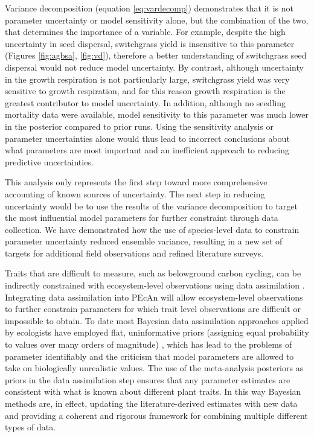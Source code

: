 \documentclass[12pt]{article}
\begin{document}
\begin{flushleft}
\begin{spacing}{1.9}
 Variance decomposition (equation \ref{eq:vardecomp}) demonstrates that it is not parameter uncertainty or model sensitivity alone, but the combination of the two, that determines the importance of a variable.
 For example, despite the high uncertainty in seed dispersal, switchgrass yield is insensitive to this parameter  (Figures \ref{fig:agbsa}, \ref{fig:vd}), therefore a better understanding of switchgrass seed dispersal would not reduce model uncertainty.
 By contrast, although uncertainty in the growth respiration is not particularly large, switchgrass yield was very sensitive to growth respiration, and for this reason growth respiration is the greatest contributor to model uncertainty.
 In addition, although no seedling mortality data were available, model sensitivity to this parameter was much lower in the posterior compared to prior runs.
 Using the sensitivity analysis or parameter uncertainties alone would thus lead to incorrect conclusions about what parameters are most important and an inefficient approach to reducing predictive uncertainties.

 This analysis only represents the first step toward more comprehensive accounting of known sources of uncertainty.
 The next step in reducing uncertainty would be to use the results of the variance decomposition to target the most influential model parameters for further constraint through data collection.
 We have demonstrated how the use of species-level data to constrain parameter uncertainty reduced ensemble variance, resulting in a new set of targets for additional field observations and refined literature surveys. 

 Traits that are difficult to measure, such as belowground carbon cycling, can be indirectly constrained with ecosystem-level observations using data assimilation \citep{luo2009pic,luo2011efd}.
 Integrating data assimilation into PEcAn will allow ecosystem-level observations to further constrain parameters for which trait level observations are difficult or impossible to obtain.
 To date most Bayesian data assimilation approaches applied by ecologists have employed flat, uninformative priors (assigning equal probability to values over many orders of magnitude) , which has lead to the problems of parameter identifiably and the criticism that model parameters are allowed to take on biologically unrealistic values.
 The use of the meta-analysis posteriors as priors in the data assimilation step ensures that any parameter estimates are consistent with what is known about different plant traits.
 In this way Bayesian methods are, in effect, updating the literature-derived estimates with new data and providing a coherent and rigorous framework for combining multiple different types of data.


\end{spacing}
\end{flushleft}
\end{document}
